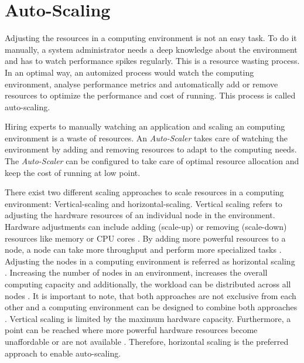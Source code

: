 \section{Auto-Scaling}
Adjusting the resources in a computing environment is not an easy task. To do it manually, a system administrator needs a deep knowledge about the environment and has to watch performance spikes regularly. This is a resource wasting process. In an optimal way, an automized process would watch the computing environment, analyse performance metrics and automatically add or remove resources to optimize the performance and cost of running. This process is called auto-scaling.


Hiring experts to manually watching an application and scaling an computing environment is a waste of resources.
An \textit{Auto-Scaler} takes care of watching the environment by adding and removing resources to adapt to the computing needs. The \textit{Auto-Scaler} can be configured to take care of optimal resource allocation and keep the cost of running at low point.


There exist two different scaling approaches to scale resources in a computing environment: Vertical-scaling and horizontal-scaling.
Vertical scaling refers to adjusting the hardware resources of an individual node in the environment. Hardware adjustments can include adding (scale-up) or removing (scale-down) resources like memory or CPU cores \cite{Wilder2012CloudPatterns}. By adding more powerful resources to a node, a node can take more throughput and perform more specialized tasks \cite{Abbott2015ScalabilityArt}.
Adjusting the nodes in a computing environment is referred as horizontal scaling \cite{Wilder2012CloudPatterns}. Increasing the number of nodes in an environment, increases the overall computing capacity and additionally, the workload can be distributed across all nodes \cite{Wilder2012CloudPatterns, Abbott2015ScalabilityArt}.
It is important to note, that both approaches are not exclusive from each other and a computing environment can be designed to combine both approaches \cite{Wilder2012CloudPatterns}.
Vertical scaling is limited by the maximum hardware capacity. Furthermore, a point can be reached where more powerful hardware resources become unaffordable or are not available \cite{Abbot2011ScalabilityRules}.  Therefore, horizontal scaling is the preferred approach to enable auto-scaling.


